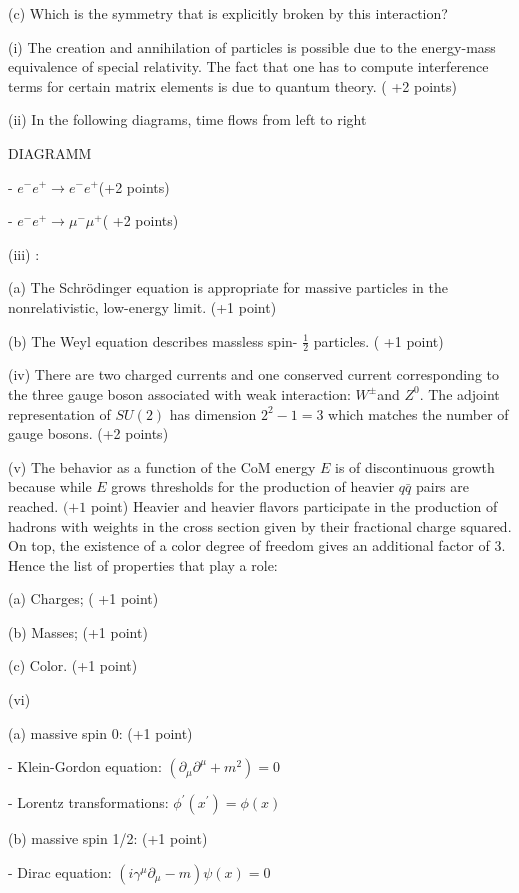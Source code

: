 \documentclass[10pt, letterpaper]{article}
\begin{document}
(c) Which is the symmetry that is explicitly broken by this interaction?



(i) The creation and annihilation of particles is possible due to the energy-mass equivalence of special relativity. The fact that one has to compute interference terms for certain matrix elements is due to quantum theory. ( +2 points)

(ii) In the following diagrams, time flows from left to right


DIAGRAMM


- $e^{-} e^{+} \rightarrow e^{-} e^{+}$(+2 points)

- $e^{-} e^{+} \rightarrow \mu^{-} \mu^{+}$( +2 points)


(iii) :

(a) The Schrödinger equation is appropriate for massive particles in the nonrelativistic, low-energy limit. (+1 point)

(b) The Weyl equation describes massless spin- $\frac{1}{2}$ particles. ( +1 point)

(iv) There are two charged currents and one conserved current corresponding to the three gauge boson associated with weak interaction: $W^{ \pm}$and $Z^0$. The adjoint representation of $S U(2)$ has dimension $2^2-1=3$ which matches the number of gauge bosons. (+2 points)

(v) The behavior as a function of the CoM energy $E$ is of discontinuous growth because while $E$ grows thresholds for the production of heavier $q \bar{q}$ pairs are reached. $(+1$ point) Heavier and heavier flavors participate in the production of hadrons with weights in the cross section given by their fractional charge squared. On top, the existence of a color degree of freedom gives an additional factor of 3. Hence the list of properties that play a role:

(a) Charges; ( +1 point)

(b) Masses; (+1 point)


(c) Color. (+1 point)

(vi) 

(a) massive spin 0: (+1 point)

- Klein-Gordon equation: $\left(\partial_\mu \partial^\mu+m^2\right)=0$

- Lorentz transformations: $\phi^{\prime}\left(x^{\prime}\right)=\phi(x)$

(b) massive spin 1/2: (+1 point)

- Dirac equation: $\left(i \gamma^\mu \partial_\mu-m\right) \psi(x)=0$
\end{document}
